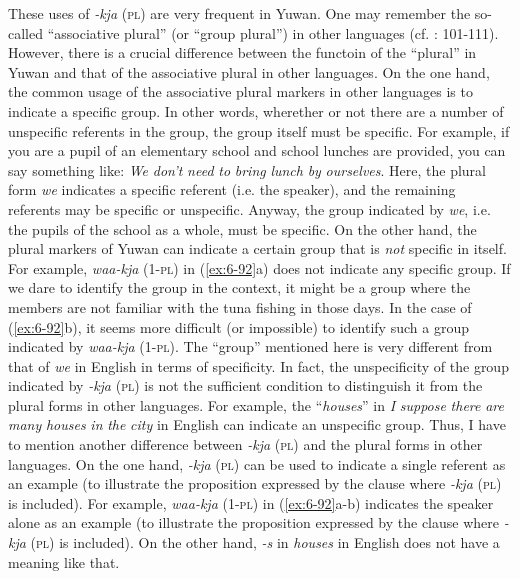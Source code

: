   These uses of \textit{-kja} (\textsc{pl}) are very frequent in Yuwan. One may remember the so-called “associative plural” (or “group plural”) in other languages (cf. \citealt{Corbett2000}: 101-111). However, there is a crucial difference between the functoin of the “plural” in Yuwan and that of the associative plural in other languages. On the one hand, the common usage of the associative plural markers in other languages is to indicate a specific group. In other words, wherether or not there are a number of unspecific referents in the group, the group itself must be specific. For example, if you are a pupil of an elementary school and school lunches are provided, you can say something like: \textit{We} \textit{don’t} \textit{need} \textit{to} \textit{bring} \textit{lunch} \textit{by} \textit{ourselves}. Here, the plural form \textit{we} indicates a specific referent (i.e. the speaker), and the remaining referents may be specific or unspecific. Anyway, the group indicated by \textit{we}, i.e. the pupils of the school as a whole, must be specific. On the other hand, the plural markers of Yuwan can indicate a certain group that is \textit{not} specific in itself. For example, \textit{waa-kja} (1-\textsc{pl}) in (\ref{ex:6-92}a) does not indicate any specific group. If we dare to identify the group in the context, it might be a group where the members are not familiar with the tuna fishing in those days. In the case of (\ref{ex:6-92}b), it seems more difficult (or impossible) to identify such a group indicated by \textit{waa-kja} (1-\textsc{pl}). The “group” mentioned here is very different from that of \textit{we} in English in terms of specificity. In fact, the unspecificity of the group indicated by \textit{-kja} (\textsc{pl}) is not the sufficient condition to distinguish it from the plural forms in other languages. For example, the “\textit{houses}” in \textit{I} \textit{suppose} \textit{there} \textit{are} \textit{many} \textit{houses} \textit{in} \textit{the} \textit{city} in English can indicate an unspecific group. Thus, I have to mention another difference between \textit{-kja} (\textsc{pl}) and the plural forms in other languages. On the one hand, \textit{-kja} (\textsc{pl}) can be used to indicate a single referent as an example (to illustrate the proposition expressed by the clause where \textit{-kja} (\textsc{pl}) is included). For example, \textit{waa-kja} (1-\textsc{pl}) in (\ref{ex:6-92}a-b) indicates the speaker alone as an example (to illustrate the proposition expressed by the clause where \textit{-kja} (\textsc{pl}) is included). On the other hand, \textit{-s} in \textit{houses} in English does not have a meaning like that.

